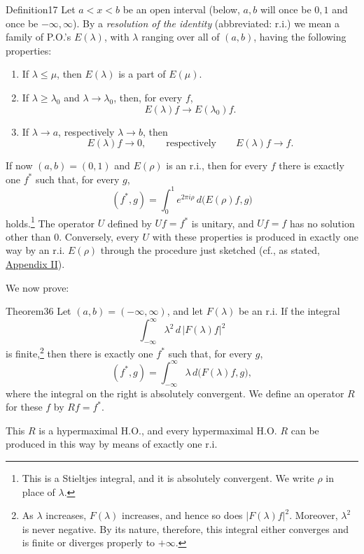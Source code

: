 ﻿\documentclass[paper=b5,fontsize=13pt,bookmarkpackage=false,twoside]{scrartcl}
\begin{document}
\begin{namedstatement}{Definition}{17}\label{def:17}
Let $a<x<b$ be an open interval (below, $a,b$ will once be $0,1$ and once be $-\infty,\infty$). By a \emph{resolution of the identity} (abbreviated: r.i.) we mean a family of P.O.'s $E(\lambda)$, with $\lambda$ ranging over all of $(a,b)$, having the following properties:

\begin{enumerate}
\renewcommand{\labelenumi}{$\alpha)$}
\item\label{def17:alpha}
If $\lambda\le\mu$, then $E(\lambda)$ is a part of $E(\mu)$.

\renewcommand{\labelenumi}{$\beta)$}
\item\label{def17:beta}
If $\lambda\ge\lambda_0$ and $\lambda\to\lambda_0$, then, for every $f$,
\[
E(\lambda)f\longrightarrow E(\lambda_0)f.
\]

\renewcommand{\labelenumi}{$\gamma)$}
\item\label{def17:gamma}
If $\lambda\to a$, respectively $\lambda\to b$, then
\[
E(\lambda)f\longrightarrow0,
\qquad\text{respectively}\qquad
E(\lambda)f\longrightarrow f.
\]
\end{enumerate}
\end{namedstatement}

If now $(a,b)=(0,1)$ and $E(\rho)$ is an r.i., then for every $f$ there is exactly one $f^*$ such that, for every $g$,
\[
(f^*,g)=\int_0^1e^{2\pi i\rho}\,d\bigl(E(\rho)f,g\bigr)
\]
holds.\footnote{\label{fn:48}This is a Stieltjes integral, and it is absolutely convergent. We write $\rho$ in place of $\lambda$.} The operator $U$ defined by $Uf=f^*$ is unitary, and $Uf=f$ has no solution other than $0$. Conversely, every $U$ with these properties is produced in exactly one way by an r.i. $E(\rho)$ through the procedure just sketched (cf., as stated, \hyperref[app:II]{Appendix II}).

We now prove:

\begin{namedstatement}{Theorem}{36}\label{thm:36}
Let $(a,b)=(-\infty,\infty)$, and let $F(\lambda)$ be an r.i. If the integral
\[
\int_{-\infty}^{\infty}\lambda^2\,d\,|F(\lambda)f|^2
\]
is finite,\footnote{\label{fn:49}As $\lambda$ increases, $F(\lambda)$ increases, and hence so does $|F(\lambda)f|^2$. Moreover, $\lambda^2$ is never negative. By its nature, therefore, this integral either converges and is finite or diverges properly to $+\infty$.} then there is exactly one $f^*$ such that, for every $g$,
\[
(f^*,g)
=\int_{-\infty}^{\infty}\lambda\,d\bigl(F(\lambda)f,g\bigr),
\]
where the integral on the right is absolutely convergent. We define an operator $R$ for these $f$ by $Rf=f^*$.

This $R$ is a hypermaximal H.O., and every hypermaximal H.O. $R$ can be produced in this way by means of exactly one r.i.
\end{namedstatement}
\end{document}
